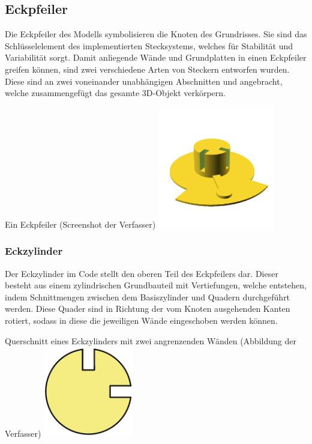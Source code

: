 \subsection{Eckpfeiler}
Die Eckpfeiler des Modells symbolisieren die Knoten des Grundrisses.
Sie sind das Schlüsselelement des implementierten Stecksystems, welches für Stabilität und Variabilität sorgt.
Damit anliegende Wände und Grundplatten in einen Eckpfeiler greifen können, sind zwei verschiedene Arten von Steckern entworfen wurden.
Diese sind an zwei voneinander unabhängigen Abschnitten  und  angebracht, welche zusammengefügt das gesamte 3D-Objekt verkörpern.

\begin{Bild}{Ein Eckpfeiler (Screenshot der Verfasser)}
	\includegraphics[height=200px]{Bilder/Untereinheit_Ecke}
\end{Bild}

\subsubsection{Eckzylinder}
Der Eckzylinder im Code  stellt den oberen Teil des Eckpfeilers dar.
Dieser besteht aus einem zylindrischen Grundbauteil mit Vertiefungen, welche entstehen, indem Schnittmengen zwischen dem Basiszylinder und Quadern durchgeführt werden.
Diese Quader sind in Richtung der vom Knoten ausgehenden Kanten rotiert, sodass in diese die jeweiligen Wände eingeschoben werden können.

\begin{Bild}{Querschnitt eines Eckzylinders mit zwei angrenzenden Wänden (Abbildung der Verfasser)}
	\includegraphics[height=150px]{Bilder/CornerCylinder2D-06.png}
\end{Bild}

